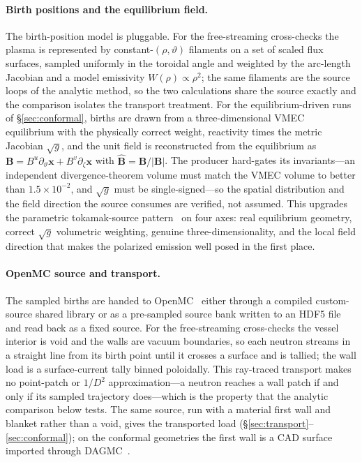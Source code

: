 \documentclass[11pt]{article}
\newcommand{\Bhat}{\hat{\bm{B}}}
\begin{document}
\paragraph{Birth positions and the equilibrium field.}
The birth-position model is pluggable. For the free-streaming cross-checks the plasma is
represented by constant-$(\rho,\vartheta)$ filaments on a set of scaled flux surfaces,
sampled uniformly in the toroidal angle and weighted by the arc-length Jacobian and a model
emissivity $W(\rho)\propto\rho^2$; the same filaments are the source loops of the analytic
method, so the two calculations share the source exactly and the comparison isolates the
transport treatment. For the equilibrium-driven runs of \S\ref{sec:conformal}, births are
drawn from a three-dimensional VMEC~\cite{hirshman1983} equilibrium with the physically
correct weight, reactivity times the metric Jacobian $\sqrt{g}$, and the unit field is
reconstructed from the equilibrium as
$\bm B=B^u\partial_\vartheta\bm x+B^v\partial_\zeta\bm x$ with $\Bhat=\bm B/|\bm B|$. The
producer hard-gates its invariants---an independent divergence-theorem volume must match
the VMEC volume to better than $1.5\times10^{-2}$, and $\sqrt{g}$ must be single-signed---so
the spatial distribution and the field direction the source consumes are verified, not
assumed. This upgrades the parametric tokamak-source
pattern~\cite{peterson_tokamaksource} on four axes: real equilibrium geometry, correct
$\sqrt{g}$ volumetric weighting, genuine three-dimensionality, and the local field
direction that makes the polarized emission well posed in the first place.

\paragraph{OpenMC source and transport.}
The sampled births are handed to OpenMC~\cite{romano2015} either through a compiled
custom-source shared library or as a pre-sampled source bank written to an HDF5 file and
read back as a fixed source. For the free-streaming cross-checks the vessel interior is
void and the walls are vacuum boundaries, so each neutron streams in a straight line from
its birth point until it crosses a surface and is tallied; the wall load is a
surface-current tally binned poloidally. This ray-traced transport makes no point-patch or
$1/D^2$ approximation---a neutron reaches a wall patch if and only if its sampled trajectory
does---which is the property that the analytic comparison below tests. The same source, run
with a material first wall and blanket rather than a void, gives the transported load
(\S\ref{sec:transport}--\ref{sec:conformal}); on the conformal geometries the first wall is
a CAD surface imported through DAGMC~\cite{dagmc}.
\end{document}
